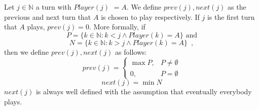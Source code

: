 \documentclass[11pt]{llncs}
\theoremstyle{definition}
\begin{document}
     \begin{definition}
        Let $j \in \mathbb{N}$ a turn with $Player\left(j\right)$ $= A$. We define $prev\left(j\right), next\left(j\right)$
        as the previous and next turn that $A$ is chosen to play respectively. If $j$ is the first turn that $A$ plays,
        $prev\left(j\right) = 0$. More formally, if
        \begin{equation}
           P = \{k \in \mathbb{N} : k < j \wedge Player\left(k\right) = A\} \mbox{ and}
        \end{equation}
        \begin{equation}
           N = \{k \in \mathbb{N} : k > j \wedge Player\left(k\right) = A\} \enspace,
        \end{equation}
        then we define $prev\left(j\right), next\left(j\right)$ as follows:
        \begin{equation}
           prev\left(j\right) = \begin{cases}
              \max{P}, & P \neq \emptyset \\
              0, & P = \emptyset
           \end{cases}
        \end{equation}
        \begin{equation}
           next\left(j\right) = \min{N}
        \end{equation}
        $next\left(j\right)$ is always well defined with the assumption that eventually everybody plays.
     \end{definition}
\end{document}
